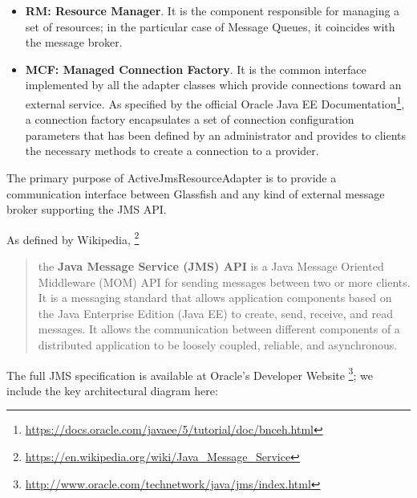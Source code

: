 \begin{itemize}
	\item \textbf{RM: Resource Manager}. It is the component responsible for managing a set of resources; in the particular case of Message Queues, it coincides with the message broker. 
	\item \textbf{MCF: Managed Connection Factory}. It is the common interface implemented by all the adapter classes which provide connections toward an external service. As specified by the official Oracle Java EE Documentation\footnote{\url{https://docs.oracle.com/javaee/5/tutorial/doc/bnceh.html}}, a connection factory encapsulates a set of connection configuration parameters that has been defined by an administrator and provides to clients the necessary methods to create a connection to a provider.
\end{itemize}



The primary purpose of ActiveJmsResourceAdapter is to provide a communication interface between Glassfish and any kind of external message broker supporting the JMS API.  

As defined by Wikipedia, \footnote{\url{https://en.wikipedia.org/wiki/Java_Message_Service}} 
\begin{quote}the \textbf{Java Message Service (JMS) API} is a Java Message Oriented Middleware (MOM) API for sending messages between two or more clients. It is a messaging standard that allows application components based on the Java Enterprise Edition (Java EE) to create, send, receive, and read messages. It allows the communication between different components of a distributed application to be loosely coupled, reliable, and asynchronous.
\end{quote}
The full JMS specification is available at Oracle's Developer Website \footnote{\url{http://www.oracle.com/technetwork/java/jms/index.html}}; we include the key architectural diagram here: 
\begin{figure}[H]
\centering
{}
\end{figure}

